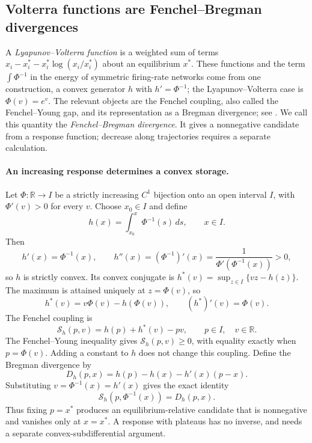 \subsection{Volterra functions are Fenchel--Bregman divergences}\label{s:FenBre}
A \emph{Lyapunov--Volterra function} is a weighted sum of terms
$x_i-x_i^*-x_i^*\log(x_i/x_i^*)$ about an equilibrium $x^*$. These functions and the term
$\int\Phi^{-1}$ in the energy of symmetric firing-rate networks \cite{Betteti2025} come from one
construction, a convex generator $h$ with $h'=\Phi^{-1}$; the Lyapunov--Volterra case is $\Phi(v)=e^v$.
The relevant objects are the Fenchel coupling, also called the Fenchel--Young gap, and its
representation as a Bregman divergence; see \cite[Appendix~C]{MertikopoulosSandholm2016}. We call
this quantity the \emph{Fenchel--Bregman divergence}. It gives a nonnegative
candidate from a response function; decrease along trajectories requires a separate calculation.

\paragraph{An increasing response determines a convex storage.}
Let $\Phi:\mathbb R\to I$ be a strictly increasing $C^1$ bijection onto an open interval $I$, with
$\Phi'(v)>0$ for every $v$. Choose $x_0\in I$ and define
\[
 h(x)=\int_{x_0}^{x}\Phi^{-1}(s)\,ds,\qquad x\in I.
\]
Then
\[
 h'(x)=\Phi^{-1}(x),\qquad
 h''(x)=(\Phi^{-1})'(x)=\frac{1}{\Phi'(\Phi^{-1}(x))}>0,
\]
so $h$ is strictly convex. Its convex conjugate is $h^*(v)=\sup_{z\in I}\{vz-h(z)\}$. The maximum is
attained uniquely at $z=\Phi(v)$, so
\[
 h^*(v)=v\Phi(v)-h(\Phi(v)),\qquad (h^*)'(v)=\Phi(v).
\]
The Fenchel coupling is
\[
 \mathcal S_h(p,v)=h(p)+h^*(v)-pv,\qquad p\in I,\quad v\in\mathbb R.
\]
The Fenchel--Young inequality gives $\mathcal S_h(p,v)\ge0$, with equality exactly when $p=\Phi(v)$.
Adding a constant to $h$ does not change this coupling. Define the Bregman divergence by
\[
 D_h(p,x)=h(p)-h(x)-h'(x)(p-x).
\]
Substituting $v=\Phi^{-1}(x)=h'(x)$ gives the exact identity
\[
 \mathcal S_h(p,\Phi^{-1}(x))=D_h(p,x).
\]
Thus fixing $p=x^*$ produces an equilibrium-relative candidate that is nonnegative and vanishes only
at $x=x^*$. A response with plateaus has no inverse, and needs a separate convex-subdifferential
argument.

